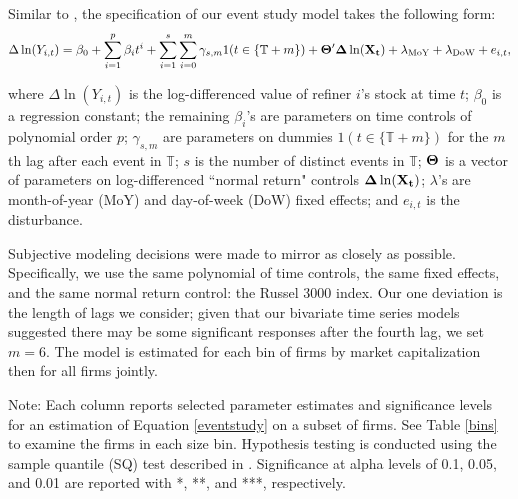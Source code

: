 \documentclass[11pt]{article}
\begin{document}
Similar to \cite{Lade2018a}, the specification of our event study model takes the following form:
\begin{equation}
\label{eventstudy}
\Delta \ln(Y_{i,t})=\beta_0 + \sum_{i=1}^{p} \beta_i t^i+\sum_{i=1}^s \sum_{i=0}^m \gamma_{s,m} 1(t\in\{\mathbb{T}+m\})+{\bf \Theta'\Delta}\ln({\bf X_t})+\lambda_{\text{MoY}}+\lambda_{\text{DoW}}+e_{i,t},
\end{equation}

\noindent where $\Delta \ln(Y_{i,t})$ is the log-differenced value of refiner $i$'s stock at time $t$; $\beta_0$ is a regression constant; the remaining $\beta_i$'s are parameters on time controls of polynomial order $p$; $\gamma_{s,m}$ are parameters on dummies $1(t\in\{\mathbb{T}+m\})$ for the $m$th lag after each event in $\mathbb{T}$; $s$ is the number of distinct events in $\mathbb{T}$; ${\bf \Theta}$ is a vector of parameters on log-differenced ``normal return" controls ${\bf \Delta}\ln({\bf X_t})$; $\lambda$'s are month-of-year (MoY) and day-of-week (DoW) fixed effects; and $e_{i,t}$ is the disturbance.

Subjective modeling decisions were made to mirror \cite{Lade2018a} as closely as possible. Specifically, we use the same polynomial of time controls, the same fixed effects, and the same normal return control: the Russel 3000 index. Our one deviation is the length of lags we consider; given that our bivariate time series models suggested there may be some significant responses after the fourth lag, we set $m=6$. The model is estimated for each bin of firms by market capitalization then for all firms jointly.

\begin{table}[!htbp] \centering 
	\caption{Results from Event Studies} 
	\label{eventstudies} 
	\begin{flushleft}
		\scriptsize{Note: Each column reports selected parameter estimates and significance levels for an estimation of Equation \ref{eventstudy} on a subset of firms. See Table \ref{bins} to examine the firms in each size bin. Hypothesis testing is conducted using the sample quantile (SQ) test described in \cite{Gelbach2013}. Significance at alpha levels of 0.1, 0.05, and 0.01 are reported with *, **, and ***, respectively.}\\
	\end{flushleft}
\end{table} 
\end{document}
